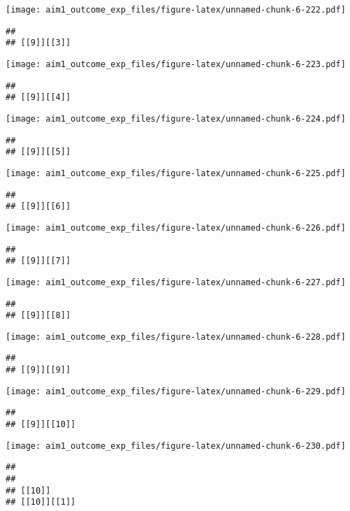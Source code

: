 \documentclass[
]{article}
\begin{document}
\texttt{[image: aim1\_outcome\_exp\_files/figure-latex/unnamed-chunk-6-222.pdf]}

\begin{verbatim}
## 
## [[9]][[3]]
\end{verbatim}

\texttt{[image: aim1\_outcome\_exp\_files/figure-latex/unnamed-chunk-6-223.pdf]}

\begin{verbatim}
## 
## [[9]][[4]]
\end{verbatim}

\texttt{[image: aim1\_outcome\_exp\_files/figure-latex/unnamed-chunk-6-224.pdf]}

\begin{verbatim}
## 
## [[9]][[5]]
\end{verbatim}

\texttt{[image: aim1\_outcome\_exp\_files/figure-latex/unnamed-chunk-6-225.pdf]}

\begin{verbatim}
## 
## [[9]][[6]]
\end{verbatim}

\texttt{[image: aim1\_outcome\_exp\_files/figure-latex/unnamed-chunk-6-226.pdf]}

\begin{verbatim}
## 
## [[9]][[7]]
\end{verbatim}

\texttt{[image: aim1\_outcome\_exp\_files/figure-latex/unnamed-chunk-6-227.pdf]}

\begin{verbatim}
## 
## [[9]][[8]]
\end{verbatim}

\texttt{[image: aim1\_outcome\_exp\_files/figure-latex/unnamed-chunk-6-228.pdf]}

\begin{verbatim}
## 
## [[9]][[9]]
\end{verbatim}

\texttt{[image: aim1\_outcome\_exp\_files/figure-latex/unnamed-chunk-6-229.pdf]}

\begin{verbatim}
## 
## [[9]][[10]]
\end{verbatim}

\texttt{[image: aim1\_outcome\_exp\_files/figure-latex/unnamed-chunk-6-230.pdf]}

\begin{verbatim}
## 
## 
## [[10]]
## [[10]][[1]]
\end{verbatim}
\end{document}

